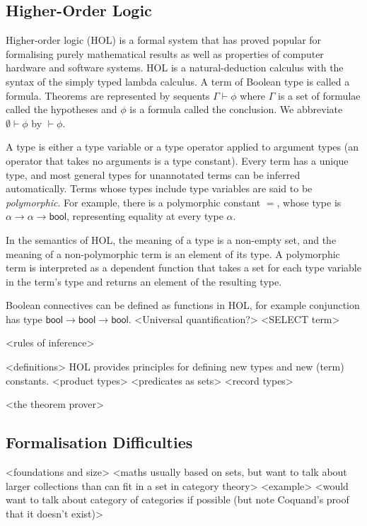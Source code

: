 \documentclass[twoside,titlepage,11pt]{article}
\begin{document}
\subsection{Higher-Order Logic}%
\newcommand{\bool}{\ensuremath{\mathsf{bool}}}
Higher-order logic (HOL) is a formal system that has proved popular for formalising purely mathematical results as well as properties of computer hardware and software systems.
HOL is a natural-deduction calculus with the syntax of the simply typed lambda calculus.
A term of Boolean type is called a formula.
Theorems are represented by sequents $\Gamma\vdash \phi$ where $\Gamma$ is a set of formulae called the hypotheses and $\phi$ is a formula called the conclusion.
We abbreviate $\emptyset\vdash\phi$ by $\vdash\phi$.%


A type is either a type variable or a type operator applied to argument types (an operator that takes no arguments is a type constant).
Every term has a unique type, and most general types for unannotated terms can be inferred automatically.
Terms whose types include type variables are said to be \emph{polymorphic}.
For example, there is a polymorphic constant $=$, whose type is $\alpha\to\alpha\to\bool$, representing equality at every type $\alpha$.

In the semantics of HOL, the meaning of a type is a non-empty set, and the meaning of a non-polymorphic term is an element of its type.
A polymorphic term is interpreted as a dependent function that takes a set for each type variable in the term's type and returns an element of the resulting type.

Boolean connectives can be defined as functions in HOL, for example conjunction has type $\bool\to\bool\to\bool$.
<Universal quantification?>
<SELECT term>

<rules of inference>

<definitions>
HOL provides principles for defining new types and new (term) constants.
<product types>
<predicates as sets>
<record types>

<the theorem prover>%
\subsection{Formalisation Difficulties}%
<foundations and size>%
  <maths usually based on sets, but want to talk about larger collections than can fit in a set in category theory>
  <example>
  <would want to talk about category of categories if possible (but note Coquand's proof that it doesn't exist)>
\end{document}
